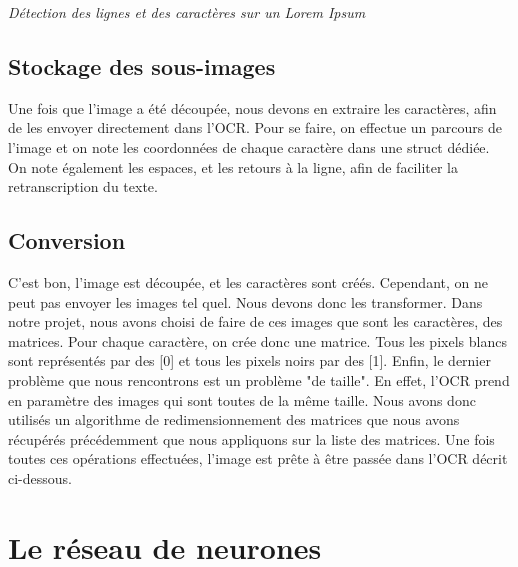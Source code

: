 \documentclass[14pt]{article}
\begin{document}
\textit{Détection des lignes et des caractères sur un Lorem Ipsum}
\newpage
\indent
\subsection{Stockage des sous-images}
Une fois que l'image a été découpée, nous devons en extraire les caractères, afin de les envoyer directement dans l'OCR. Pour se faire, on effectue un parcours de l'image et on note les coordonnées de chaque caractère dans une struct dédiée. On note également les espaces, et les retours à la ligne, afin de faciliter la retranscription du texte. 

\indent
\subsection{Conversion}
C'est bon, l'image est découpée, et les caractères sont créés. Cependant, on ne peut pas envoyer les images tel quel. Nous devons donc les transformer. Dans notre projet, nous avons choisi de faire de ces images que sont les caractères, des matrices. Pour chaque caractère, on crée donc une matrice. Tous les pixels blancs sont représentés par des [0] et tous les pixels noirs par des [1]. Enfin, le dernier problème que nous rencontrons est un problème "de taille". 
En effet, l'OCR prend en paramètre des images qui sont toutes de la même taille. Nous avons donc utilisés un algorithme de redimensionnement des matrices que nous avons récupérés précédemment que nous appliquons sur la liste des matrices. 
Une fois toutes ces opérations effectuées, l'image est prête à être passée dans l'OCR décrit ci-dessous.
\newpage
\indent
\section{Le réseau de neurones}
\end{document}
